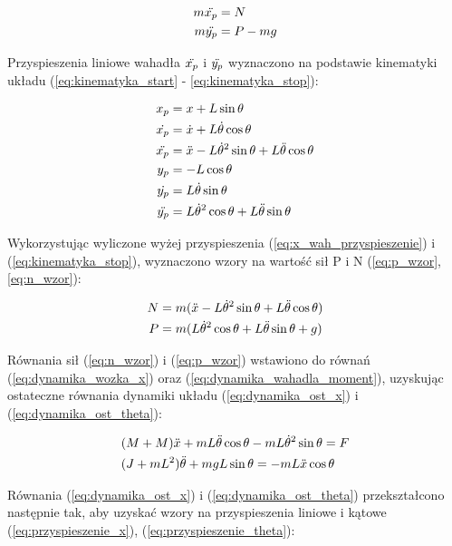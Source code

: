 \documentclass[12pt]{article}
\numberwithin{equation}{section}
\begin{document}
\begin{align}
    m\Ddot{x_{p}} &= N \label{eq:dynamika_wahadla_x}\\
    m\Ddot{y_{p}} &= P - mg \label{eq:dynamika_wahadla_y}
\end{align}

Przyspieszenia liniowe wahadła $\Ddot{x_{p}}$ i $\Ddot{y_{p}}$ wyznaczono na podstawie kinematyki układu (\ref{eq:kinematyka_start} - \ref{eq:kinematyka_stop}):

\begin{align}
    x_{p} &= x + L\sin{\theta} \label{eq:kinematyka_start}\\
    \dot{x_{p}} &= \dot{x} + L\dot{\theta}\cos{\theta} \\
    \Ddot{x_{p}} &= \Ddot{x} - L\dot{\theta}^{2}\sin{\theta} + L\Ddot{\theta}\cos{\theta}\label{eq:x_wah_przyspieszenie} \\
    y_{p} &= -L\cos{\theta} \\
    \dot{y_{p}} &= L\dot{\theta}\sin{\theta} \\
    \Ddot{y_{p}} &= L\dot{\theta}^{2}\cos{\theta} + L\Ddot{\theta}\sin{\theta}\label{eq:kinematyka_stop}
\end{align}

Wykorzystując wyliczone wyżej przyspieszenia (\ref{eq:x_wah_przyspieszenie}) i (\ref{eq:kinematyka_stop}), wyznaczono wzory na wartość sił P i N (\ref{eq:p_wzor}, \ref{eq:n_wzor}):

\begin{align}
    N &= m(\Ddot{x} - L\dot{\theta}^{2}\sin{\theta} + L\Ddot{\theta}\cos{\theta}) \label{eq:n_wzor} \\
    P &= m(L\dot{\theta}^{2}\cos{\theta} + L\Ddot{\theta}\sin{\theta} + g) \label{eq:p_wzor}
\end{align}

Równania sił (\ref{eq:n_wzor}) i (\ref{eq:p_wzor}) wstawiono do równań (\ref{eq:dynamika_wozka_x}) oraz (\ref{eq:dynamika_wahadla_moment}), uzyskując ostateczne równania dynamiki układu (\ref{eq:dynamika_ost_x}) i (\ref{eq:dynamika_ost_theta}):

\begin{align}
    &(M+M)\Ddot{x} + mL\Ddot{\theta}\cos{\theta} - mL\dot{\theta}^{2}\sin{\theta} = F \label{eq:dynamika_ost_x}\\
    &(J+mL^{2})\Ddot{\theta} + mgL\sin{\theta} = -mL\Ddot{x}\cos{\theta} \label{eq:dynamika_ost_theta}
\end{align}

Równania (\ref{eq:dynamika_ost_x}) i (\ref{eq:dynamika_ost_theta}) przekształcono następnie tak, aby uzyskać wzory na przyspieszenia liniowe i kątowe (\ref{eq:przyspieszenie_x}), (\ref{eq:przyspieszenie_theta}):
\end{document}
